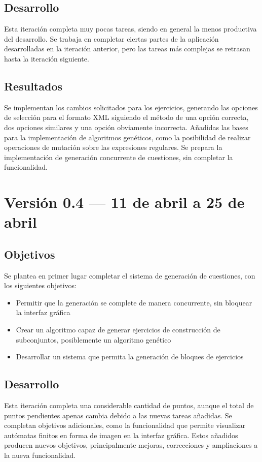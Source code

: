 \subsection{Desarrollo}
Esta iteración completa muy pocas tareas, siendo en general la menos productiva del desarrollo.
Se trabaja en completar ciertas partes de la aplicación desarrolladas en la iteración anterior, pero las tareas más complejas se retrasan hasta la iteración siguiente.


\subsection{Resultados}
Se implementan los cambios solicitados para los ejercicios, generando las opciones de selección para el formato XML siguiendo el método de una opción correcta, dos opciones similares y una opción obviamente incorrecta.
Añadidas las bases para la implementación de algoritmos genéticos, como la posibilidad de realizar operaciones de mutación sobre las expresiones regulares.
Se prepara la implementación de generación concurrente de cuestiones, sin completar la funcionalidad.

\section{Versión 0.4 --- 11 de abril a 25 de abril}
\subsection{Objetivos}
Se plantea en primer lugar completar el sistema de generación de cuestiones, con los siguientes objetivos:
\begin{itemize}
	\item Permitir que la generación se complete de manera concurrente, sin bloquear la interfaz gráfica
	\item Crear un algoritmo capaz de generar ejercicios de construcción de subconjuntos, posiblemente un algoritmo genético
	\item Desarrollar un sistema que permita la generación de bloques de ejercicios
\end{itemize}

\subsection{Desarrollo}
Esta iteración completa una considerable cantidad de puntos, aunque el total de puntos pendientes apenas cambia debido a las nuevas tareas añadidas.
Se completan objetivos adicionales, como la funcionalidad que permite visualizar autómatas finitos en forma de imagen en la interfaz gráfica.
Estos añadidos producen nuevos objetivos, principalmente mejoras, correcciones y ampliaciones a la nueva funcionalidad.


